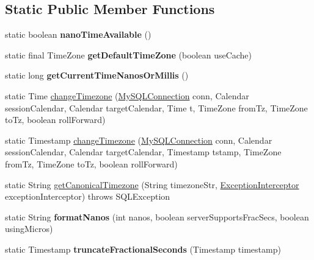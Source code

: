 \subsection*{Static Public Member Functions}
\begin{DoxyCompactItemize}
\item 
\mbox{\label{classcom_1_1mysql_1_1jdbc_1_1_time_util_afcbab5475dce3d528c5a4c986a6ed1e7}} 
static boolean {\bfseries nano\+Time\+Available} ()
\item 
\mbox{\label{classcom_1_1mysql_1_1jdbc_1_1_time_util_ad010f6e840b838715ca9d45b68c39372}} 
static final Time\+Zone {\bfseries get\+Default\+Time\+Zone} (boolean use\+Cache)
\item 
\mbox{\label{classcom_1_1mysql_1_1jdbc_1_1_time_util_ae2e0d6466619c4ae0a3151d4d7f2e05f}} 
static long {\bfseries get\+Current\+Time\+Nanos\+Or\+Millis} ()
\item 
static Time \mbox{\hyperlink{classcom_1_1mysql_1_1jdbc_1_1_time_util_ad72309c404fe0fd1396ae37305bab486}{change\+Timezone}} (\mbox{\hyperlink{interfacecom_1_1mysql_1_1jdbc_1_1_my_s_q_l_connection}{My\+S\+Q\+L\+Connection}} conn, Calendar session\+Calendar, Calendar target\+Calendar, Time t, Time\+Zone from\+Tz, Time\+Zone to\+Tz, boolean roll\+Forward)
\item 
static Timestamp \mbox{\hyperlink{classcom_1_1mysql_1_1jdbc_1_1_time_util_a65e39dc7a1a236b17c20ce533ac5ae76}{change\+Timezone}} (\mbox{\hyperlink{interfacecom_1_1mysql_1_1jdbc_1_1_my_s_q_l_connection}{My\+S\+Q\+L\+Connection}} conn, Calendar session\+Calendar, Calendar target\+Calendar, Timestamp tstamp, Time\+Zone from\+Tz, Time\+Zone to\+Tz, boolean roll\+Forward)
\item 
static String \mbox{\hyperlink{classcom_1_1mysql_1_1jdbc_1_1_time_util_a0b298be0053e240dace4c16d7c1bea14}{get\+Canonical\+Timezone}} (String timezone\+Str, \mbox{\hyperlink{interfacecom_1_1mysql_1_1jdbc_1_1_exception_interceptor}{Exception\+Interceptor}} exception\+Interceptor)  throws S\+Q\+L\+Exception 
\item 
\mbox{\label{classcom_1_1mysql_1_1jdbc_1_1_time_util_acf65a561b129f5ef51f66b3e21e19bdc}} 
static String {\bfseries format\+Nanos} (int nanos, boolean server\+Supports\+Frac\+Secs, boolean using\+Micros)
\item 
\mbox{\label{classcom_1_1mysql_1_1jdbc_1_1_time_util_a41495e5a5b86ab90190d48d20c98e736}} 
static Timestamp {\bfseries truncate\+Fractional\+Seconds} (Timestamp timestamp)
\end{DoxyCompactItemize}
